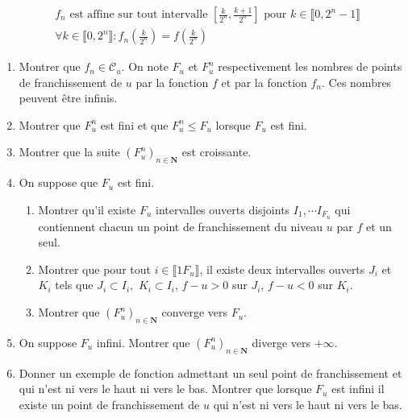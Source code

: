 \begin{displaymath}
 \begin{align}
   &f_{n} \text{ est affine sur tout intervalle } [ \frac{k}{2^{n}},\frac{k+1}{2^{n}}] \text{ pour } k\in \llbracket 0, 2^{n}-1 \rrbracket \\
   &\forall k\in \llbracket 0, 2^{n} \rrbracket : f_{n}(\frac{k}{2^{n}} ) = f(\frac{k}{2^{n}})
 \end{align}
\end{displaymath}

\begin{enumerate}
\item  Montrer que $f_{n}\in \mathcal{C}_{u}$. On note $F_{u}$ et $F_{u}^{n}$ respectivement les nombres de points de franchissement de $u$ par la
fonction $f$ et par la fonction $f_{n}$. Ces nombres peuvent {\^e}tre infinis.

\item  Montrer que $F_{u}^{n}$ est fini et que $F_{u}^{n}\leq F_{u}$ lorsque $F_{u}$ est fini.

\item  Montrer que la suite $(F_{u}^{n})_{n\in \mathbf{N}}$ est croissante.

\item  On suppose que $F_{u}$ est fini.

\begin{enumerate}
\item  Montrer qu'il existe $F_{u}$ intervalles ouverts disjoints $I_{1},\cdots I_{F_{u}}$ qui contiennent chacun un point de franchissement du
niveau $u$ par $f$ et un seul.

\item  Montrer que pour tout $i\in \llbracket 1 F_{u}\rrbracket$, il existe deux intervalles ouverts $J_{i}$ et $K_{i}$ tels que
$J_{i}\subset I_{i},$ $K_{i}\subset I_{i}$, $f-u>0$ sur $J_{i}$, $f-u<0$ sur $K_{i}$.

\item  Montrer que $(F_{u}^{n})_{n\in \mathbf{N}}$ converge vers $F_{u}$.
\end{enumerate}

\item  On suppose $F_{u}$ infini. Montrer que $(F_{u}^{n})_{n\in \mathbf{N}}$ diverge vers $+\infty $.

\item Donner un exemple de fonction admettant un seul point de franchissement et qui n'est ni vers le haut ni vers le bas.\newline
 Montrer que lorsque $F_{u}$ est infini il existe un point de franchissement de $u$ qui n'est ni vers le haut ni vers le bas.
\end{enumerate}
